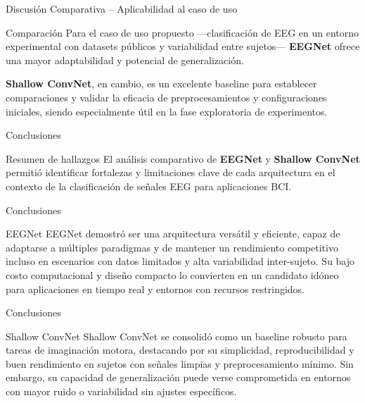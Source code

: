 \documentclass{beamer}
\begin{document}
\begin{frame}{Discusión Comparativa – Aplicabilidad al caso de uso}
\begin{block}{Comparación}
Para el caso de uso propuesto —clasificación de EEG en un entorno experimental con datasets públicos y variabilidad entre sujetos— \textbf{EEGNet} ofrece una mayor adaptabilidad y potencial de generalización.  

\textbf{Shallow ConvNet}, en cambio, es un excelente baseline para establecer comparaciones y validar la eficacia de preprocesamientos y configuraciones iniciales, siendo especialmente útil en la fase exploratoria de experimentos.
\end{block}
\end{frame}

\begin{frame}{Conclusiones}
\begin{block}{Resumen de hallazgos}
El análisis comparativo de \textbf{EEGNet} y \textbf{Shallow ConvNet} permitió identificar fortalezas y limitaciones clave de cada arquitectura en el contexto de la clasificación de señales EEG para aplicaciones BCI.
\end{block}
\end{frame}

\begin{frame}{Conclusiones}
\begin{block}{EEGNet}
EEGNet demostró ser una arquitectura versátil y eficiente, capaz de adaptarse a múltiples paradigmas y de mantener un rendimiento competitivo incluso en escenarios con datos limitados y alta variabilidad inter-sujeto.  
Su bajo costo computacional y diseño compacto lo convierten en un candidato idóneo para aplicaciones en tiempo real y entornos con recursos restringidos.
\end{block}
\end{frame}

\begin{frame}{Conclusiones}
\begin{block}{Shallow ConvNet}
Shallow ConvNet se consolidó como un baseline robusto para tareas de imaginación motora, destacando por su simplicidad, reproducibilidad y buen rendimiento en sujetos con señales limpias y preprocesamiento mínimo.  
Sin embargo, su capacidad de generalización puede verse comprometida en entornos con mayor ruido o variabilidad sin ajustes específicos.
\end{block}
\end{frame}
\end{document}
